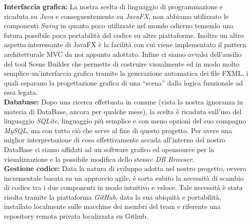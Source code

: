 \documentclass[a4paper,12pt,titlepage]{article}
\begin{document}
\textbf{Interfaccia grafica: }La nostra scelta di linguaggio di programmazione e ricaduta su \textit{Java} e conseguentemente su \textit{JavaFX}, non abbiamo utilizzato le componenti \textit{Swing} in quanto poco utilizzate nel mondo odierno temendo una futura possibile poca portabilità del codice su altre piattaforme.
Inoltre un altro aspetto interessante di JavaFX è la facilità con cui viene implementato il pattern architetturale MVC
da noi appunto adottato. Infine ci siamo avvalsi dell’ausilio del tool Scene Builder che permette di costruire visualmente ed
in modo molto semplice un’interfaccia grafica tramite la generazione automatica dei file FXML, i quali separano la progettazione grafica di una “scena” dalla logica funzionale ad essa legata.\\

\textbf{Dababase: }Dopo una ricerca effettuata in comune (vista la nostra ignoranza in materia di DataBase, ancora per qualche mese), la scelta è ricaduta sull'uso del linguaggio \textit{SQLite}, linguaggio più semplice e con meno opzioni del suo compagno \textit{MySQL}, ma con tutto ciò che serve al fine di questo progetto. Per avere una miglior interpretazione di cosa effettivamente accada all'interno del nostro DataBase ci siamo affidati ad un software grafico ed opensource per la visualizzazione e la possibile modifica dello stesso: \textit{DB Browser}.\\

\textbf{Gestione codice: }Data la natura di sviluppo adotta nel nostro progetto, ovvero incrementale basata su un approccio agile, è sorta subito la necessità di scambio di codice tra i due componenti in modo intuitivo e veloce. Tale necessità è stata risolta tramite la piattaforma \textit{GitHub}, data la sua ubiquità e portabilità, installato localmente sulle macchine dei membri del team e riferente una repository remota privata localizzata su Github.\\
\end{document}
